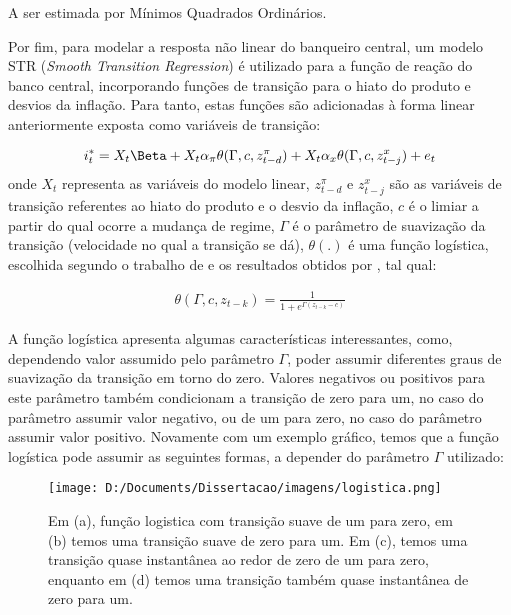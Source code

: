 \documentclass[
	article,			%
	11pt,				%
	oneside,			%
	a4paper,			%
	english,			%
	brazil,				%
	]{abntex2}
\begin{document}
	A ser estimada por Mínimos Quadrados Ordinários.
	
	Por fim, para modelar a resposta não linear do banqueiro central, um modelo STR (\textit{Smooth Transition Regression}) é utilizado para a função de reação do banco central, incorporando funções de transição para o hiato do produto e desvios da inflação. Para tanto, estas funções são adicionadas à forma linear anteriormente exposta como variáveis de transição:
	
	\begin{equation}
		i_t^* = X_t \Beta + X_t \alpha_\pi \theta(\Gamma,c,z_{t-d}^\pi) + X_t \alpha_x \theta (\Gamma,c,z_{t-j}^x) + e_t
	\end{equation}
	onde $X_t$ representa as variáveis do modelo linear, $z_{t-d}^\pi$ e $z_{t-j}^x$ são as variáveis de transição referentes ao hiato do produto e o desvio da inflação, $c$ é o limiar a partir do qual ocorre a mudança de regime, $\Gamma$ é o parâmetro de suavização da transição (velocidade no qual a transição se dá), $\theta(.)$ é uma função logística, escolhida segundo o trabalho de  e os resultados obtidos por , tal qual:
	
	\begin{eqnarray}  \label{func_log}
		\theta (\Gamma,c,z_{t-k}) = \frac{1}{1+e^{\Gamma (z_{t-k} - c)}} 
	\end{eqnarray}
	
	A função logística apresenta algumas características interessantes, como, dependendo valor assumido pelo parâmetro $\Gamma$, poder assumir diferentes graus de suavização da transição em torno do zero. Valores negativos ou positivos para este parâmetro também condicionam a transição de zero para um, no caso do parâmetro assumir valor negativo, ou de um para zero, no caso do parâmetro assumir valor positivo. Novamente com um exemplo gráfico, temos que a função logística pode assumir as seguintes formas, a depender do parâmetro $\Gamma$ utilizado:
	
	
	\hfill \break
	\hfill \break
	\hfill \break
	\hfill \break
	\hfill \break
	\hfill \break
	\hfill \break
	\hfill \break
	\hfill \break
	\hfill \break
	\hfill \break
	\hfill \break
	\hfill \break
	
	\begin{figure}[!h]
	\texttt{[image: D:/Documents/Dissertacao/imagens/logistica.png]}
	\caption{Em (a), função logistica com transição suave de um para zero, em (b) temos uma transição suave de zero para um. Em (c), temos uma transição quase instantânea ao redor de zero de um para zero, enquanto em (d) temos uma transição também quase instantânea de zero para um.}
	\label{fig:logistica}
	\end{figure}
	
\end{document}

